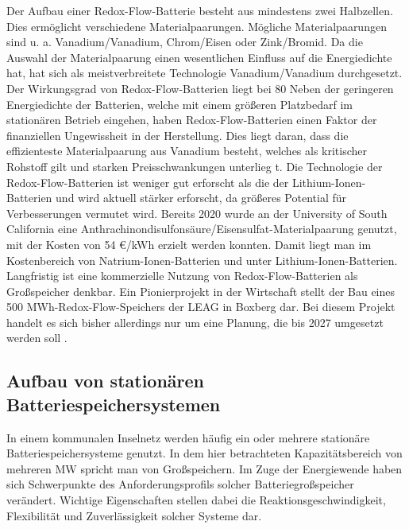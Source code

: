 Der Aufbau einer Redox-Flow-Batterie besteht aus mindestens zwei Halbzellen. Dies ermöglicht verschiedene Materialpaarungen. Mögliche Materialpaarungen sind u. a. Vanadium/Vanadium, Chrom/Eisen oder Zink/Bromid. Da die Auswahl der Materialpaarung einen wesentlichen Einfluss auf die Energiedichte hat, hat sich als meistverbreitete Technologie Vanadium/Vanadium durchgesetzt. 
Der Wirkungsgrad von Redox-Flow-Batterien liegt bei 80 %
Neben der geringeren Energiedichte der Batterien, welche mit einem größeren Platzbedarf im stationären Betrieb eingehen, haben Redox-Flow-Batterien einen Faktor der finanziellen Ungewissheit in der Herstellung. Dies liegt daran, dass die effizienteste Materialpaarung aus Vanadium besteht, welches als kritischer Rohstoff gilt und starken Preisschwankungen unterlieg t.
Die Technologie der Redox-Flow-Batterien ist weniger gut erforscht als die der Lithium-Ionen-Batterien und wird aktuell stärker erforscht, da größeres Potential für Verbesserungen vermutet wird. Bereits 2020 wurde an der University of South California eine Anthrachinondisulfonsäure/Eisensulfat-Materialpaarung genutzt, mit der Kosten von 54 €/kWh  erzielt werden konnten. Damit liegt man im Kostenbereich von Natrium-Ionen-Batterien und unter Lithium-Ionen-Batterien. Langfristig ist eine kommerzielle Nutzung von Redox-Flow-Batterien als Großspeicher denkbar. Ein Pionierprojekt in der Wirtschaft stellt der Bau eines 500 MWh-Redox-Flow-Speichers der LEAG in Boxberg dar. Bei diesem Projekt handelt es sich bisher allerdings nur um eine Planung, die bis 2027 umgesetzt werden soll .

\subsection{Aufbau von stationären Batteriespeichersystemen}

In einem kommunalen Inselnetz werden häufig ein oder mehrere stationäre Batteriespeichersysteme genutzt. In dem hier betrachteten Kapazitätsbereich von mehreren MW spricht man von Großspeichern. Im Zuge der Energiewende haben sich Schwerpunkte des Anforderungsprofils solcher Batteriegroßspeicher verändert. Wichtige Eigenschaften stellen dabei die Reaktionsgeschwindigkeit, Flexibilität und Zuverlässigkeit solcher Systeme dar.
 

